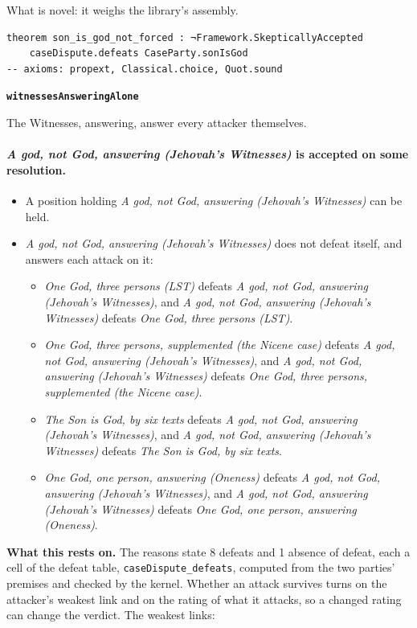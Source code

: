 \documentclass[11pt,paper=\testimonypaper,DIV=13,parskip=false]{scrartcl}
\begin{document}
What is novel: it weighs the library’s assembly.

{\small\begin{verbatim}
theorem son_is_god_not_forced : ¬Framework.SkepticallyAccepted
    caseDispute.defeats CaseParty.sonIsGod
-- axioms: propext, Classical.choice, Quot.sound
\end{verbatim}}
\par\medskip\noindent\textbf{\texttt{witnesses\allowbreak{}Answering\allowbreak{}Alone}}\par\nobreak\noindent
The Witnesses, answering, answer every attacker themselves.

\paragraph{\emph{A god, not God, answering (Jehovah’s Witnesses)} is accepted on some resolution.}
\begin{itemize}
\item A position holding \emph{A god, not God, answering (Jehovah’s Witnesses)} can be held.
\item \emph{A god, not God, answering (Jehovah’s Witnesses)} does not defeat itself, and answers each attack on it:
\begin{itemize}
\item \emph{One God, three persons (LST)} defeats \emph{A god, not God, answering (Jehovah’s Witnesses)}, and \emph{A god, not God, answering (Jehovah’s Witnesses)} defeats \emph{One God, three persons (LST)}.
\item \emph{One God, three persons, supplemented (the Nicene case)} defeats \emph{A god, not God, answering (Jehovah’s Witnesses)}, and \emph{A god, not God, answering (Jehovah’s Witnesses)} defeats \emph{One God, three persons, supplemented (the Nicene case)}.
\item \emph{The Son is God, by six texts} defeats \emph{A god, not God, answering (Jehovah’s Witnesses)}, and \emph{A god, not God, answering (Jehovah’s Witnesses)} defeats \emph{The Son is God, by six texts}.
\item \emph{One God, one person, answering (Oneness)} defeats \emph{A god, not God, answering (Jehovah’s Witnesses)}, and \emph{A god, not God, answering (Jehovah’s Witnesses)} defeats \emph{One God, one person, answering (Oneness)}.
\end{itemize}
\end{itemize}
\par\noindent\textbf{What this rests on.} The reasons state 8 defeats and 1 absence of defeat, each a cell of the defeat table, \texttt{case\allowbreak{}Dispute\_\allowbreak{}defeats}, computed from the two parties' premises and checked by the kernel. Whether an attack survives turns on the attacker's weakest link and on the rating of what it attacks, so a changed rating can change the verdict. The weakest links:
\end{document}

